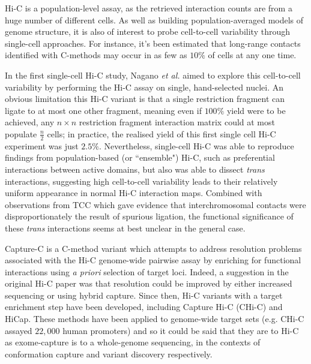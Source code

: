 \documentclass[a4paper,11pt,oneside]{book}
\begin{document}
Hi-C is a population-level assay, as the retrieved interaction counts are from a huge number of different cells. As well as building population-averaged models of genome structure, it is also of interest to probe cell-to-cell variability through single-cell approaches. For instance, it's been estimated that long-range contacts identified with C-methods may occur in as few as $10\%$ of cells at any one time.\cite{VanSteensel2010} 

In the first single-cell Hi-C study, Nagano \emph{et al.}\cite{Nagano2013} aimed to explore this cell-to-cell variability by performing the Hi-C assay on single, hand-selected nuclei. An obvious limitation this Hi-C variant is that a single restriction fragment can ligate to at most one other fragment, meaning even if $100\%$ yield were to be achieved, any $n \times n$ restriction fragment interaction matrix could at most populate $\frac{n}{2}$ cells; in practice, the realised yield of this first single cell Hi-C experiment was just $2.5\%$.\cite{Nagano2013} Nevertheless, single-cell Hi-C was able to reproduce findings from population-based (or ``ensemble") Hi-C, such as preferential interactions between active domains, but also was able to dissect \emph{trans} interactions, suggesting high cell-to-cell variability leads to their relatively uniform appearance in normal Hi-C interaction maps.\cite{Nagano2013} Combined with observations from TCC which gave evidence that interchromosomal contacts were disproportionately the result of spurious ligation,\cite{Kalhor2012} the functional significance of these \emph{trans} interactions seems at best unclear in the general case.

Capture-C is a C-method variant which attempts to address resolution problems associated with the Hi-C genome-wide pairwise assay by enriching for functional interactions using \emph{a priori} selection of target loci.\cite{Hughes2014} Indeed, a suggestion in the original Hi-C paper was that resolution could be improved by either increased sequencing or using hybrid capture.\cite{Lieberman2009} Since then, Hi-C variants with a target enrichment step have been developed, including Capture Hi-C (CHi-C)\cite{Dryden2014} and HiCap.\cite{Sahlen2015} These methods have been applied to genome-wide target sets (e.g. CHi-C assayed $22,000$ human promoters\cite{Mifsud2015}) and so it could be said that they are to Hi-C as exome-capture is to a whole-genome sequencing, in the contexts of conformation capture and variant discovery respectively. 

\end{document}
